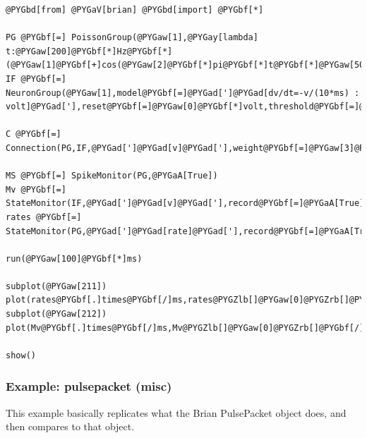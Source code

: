 \documentclass[letterpaper,10pt,english]{manual}
\begin{document}
\begin{Verbatim}[commandchars=@\[\]]
@PYGbd[from] @PYGaV[brian] @PYGbd[import] @PYGbf[*]

PG @PYGbf[=] PoissonGroup(@PYGaw[1],@PYGay[lambda] t:@PYGaw[200]@PYGbf[*]Hz@PYGbf[*](@PYGaw[1]@PYGbf[+]cos(@PYGaw[2]@PYGbf[*]pi@PYGbf[*]t@PYGbf[*]@PYGaw[50]@PYGbf[*]Hz)))
IF @PYGbf[=] NeuronGroup(@PYGaw[1],model@PYGbf[=]@PYGad[']@PYGad[dv/dt=-v/(10*ms) : volt]@PYGad['],reset@PYGbf[=]@PYGaw[0]@PYGbf[*]volt,threshold@PYGbf[=]@PYGaw[10]@PYGbf[*]mV)

C @PYGbf[=] Connection(PG,IF,@PYGad[']@PYGad[v]@PYGad['],weight@PYGbf[=]@PYGaw[3]@PYGbf[*]mV)

MS @PYGbf[=] SpikeMonitor(PG,@PYGaA[True])
Mv @PYGbf[=] StateMonitor(IF,@PYGad[']@PYGad[v]@PYGad['],record@PYGbf[=]@PYGaA[True])
rates @PYGbf[=] StateMonitor(PG,@PYGad[']@PYGad[rate]@PYGad['],record@PYGbf[=]@PYGaA[True])

run(@PYGaw[100]@PYGbf[*]ms)

subplot(@PYGaw[211])
plot(rates@PYGbf[.]times@PYGbf[/]ms,rates@PYGZlb[]@PYGaw[0]@PYGZrb[]@PYGbf[/]Hz)
subplot(@PYGaw[212])
plot(Mv@PYGbf[.]times@PYGbf[/]ms,Mv@PYGZlb[]@PYGaw[0]@PYGZrb[]@PYGbf[/]mV)

show()
\end{Verbatim}

\resetcurrentobjects
\hypertarget{--doc-examples-misc_pulsepacket}{}

\hypertarget{index-80}{}\subsubsection{Example: pulsepacket (misc)}

This example basically replicates what the Brian PulsePacket object does,
and then compares to that object.
\end{document}
